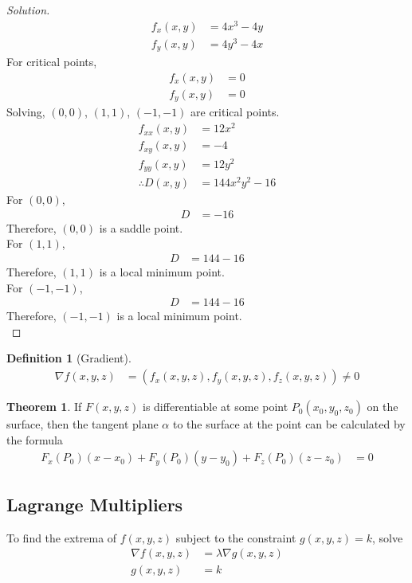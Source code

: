 \documentclass[fleqn, a4paper, 10pt]{article}
\theoremstyle{definition}
\newtheorem{definition}{Definition}
\theoremstyle{theorem}
\newtheorem{theorem}{Theorem}
\theoremstyle{remark}
\newenvironment{solution}
	{\begin{proof}[Solution]\let\qed\relax}
	{\end{proof}}
\begin{document}
\begin{multicols}{2}
\begin{solution}
	\begin{align*}
		f_x(x,y) &= 4x^3 - 4y\\
		f_y(x,y) &= 4y^3 - 4x
	\end{align*}
	For critical points,
	\begin{align*}
		f_x(x,y) &= 0\\
		f_y(x,y) &= 0
	\end{align*}
	Solving, $(0,0)$, $(1,1)$, $(-1,-1)$ are critical points.
	\begin{align*}
		f_{xx}(x,y) &= 12x^2\\
		f_{xy}(x,y) &= -4\\
		f_{yy}(x,y) &= 12y^2\\
		\therefore D(x,y) &= 144 x^2 y^2 - 16
	\end{align*}
	For $(0,0)$,
	\begin{align*}
		D &= -16
	\end{align*}
	Therefore, $(0,0)$ is a saddle point.\\
	For $(1,1)$,
	\begin{align*}
		D &= 144-16
	\end{align*}
	Therefore, $(1,1)$ is a local minimum point.\\
	For $(-1,-1)$,
	\begin{align*}
		D &= 144-16
	\end{align*}
	Therefore, $(-1,-1)$ is a local minimum point.\\
\end{solution}


\begin{definition}[Gradient]
	\begin{align*}
		\nabla f(x, y, z) &= (f_x(x, y, z), f_y(x, y, z), f_z(x, y, z)) \neq 0
	\end{align*}
\end{definition}

\begin{theorem}
	If $F(x, y, z)$ is differentiable at some point $P_0 (x_0, y_0, z_0)$ on the surface, then the tangent plane $\alpha$ to the surface at the point can be calculated by the formula
	\begin{align*}
	F_x (P_0) (x - x_0) + F_y (P_0) (y - y_0) + F_z (P_0) (z - z_0) &= 0
	\end{align*}
\end{theorem}

\subsection{Lagrange Multipliers}
To find the extrema of $f(x,y,z)$ subject to the constraint $g(x,y,z) = k$, solve
\begin{align*}
	\nabla f(x,y,z) &= \lambda \nabla g(x,y,z)\\
	g(x,y,z) &= k
\end{align*}


\end{multicols}
\end{document}
